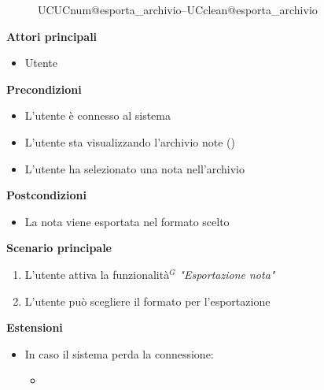 \documentclass[a4paper,10pt]{article}
\makeatletter
\def\UCText#1{UC\csname UCnum@#1\endcsname\space--\space\csname UCclean@#1\endcsname}%
\makeatother
\begin{document}
    \begin{figure}[H]
    \centering

    \caption{\UCText{esporta_archivio}}
    \label{fig:esporta_archivio_usecase}
    \end{figure}

    \textbf{Attori principali}
    \begin{itemize}
        \item Utente
    \end{itemize}
    \textbf{Precondizioni}
    \begin{itemize}
        \item L'utente è connesso al sistema
        \item L'utente sta visualizzando l'archivio note ()
        \item L'utente ha selezionato una nota nell'archivio
    \end{itemize}
    \textbf{Postcondizioni}
    \begin{itemize}
        \item La nota viene esportata nel formato scelto
    \end{itemize}
    \textbf{Scenario principale}
    \begin{enumerate}
        \item L'utente attiva la funzionalità$^G$ \textit{"Esportazione nota"}
        \item L'utente può scegliere il formato per l'esportazione
    \end{enumerate}
    \textbf{Estensioni}
    \begin{itemize}
        \item In caso il sistema perda la connessione:
        \begin{itemize}
            \item {}
        \end{itemize}
    \end{itemize}
\end{document}
